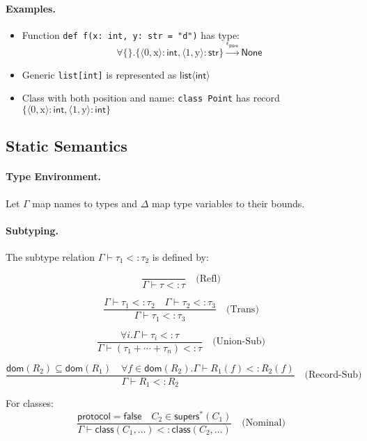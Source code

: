 \paragraph{Examples.}
\begin{itemize}
\item Function \texttt{def f(x: int, y: str = "d")} has type:
 \[\forall \{\}.\{\langle 0, \text{x} \rangle : \mathsf{int}, \langle 1, \text{y} \rangle : \mathsf{str}\} \xrightarrow{\epsilon_\mathsf{pure}} \mathsf{None}\]
\item Generic \texttt{list[int]} is represented as $\mathsf{list}\langle\mathsf{int}\rangle$
\item Class with both position and name: \texttt{class Point} has record $\{\langle 0, \text{x} \rangle : \mathsf{int}, \langle 1, \text{y} \rangle : \mathsf{int}\}$
\end{itemize}

\subsection{Static Semantics}

\paragraph{Type Environment.} Let $\Gamma$ map names to types and $\Delta$ map type variables to their bounds.

\paragraph{Subtyping.} The subtype relation $\Gamma \vdash \tau_1 <: \tau_2$ is defined by:

\[
\frac{}{\Gamma \vdash \tau <: \tau} \quad \text{(Refl)}
\]

\[
\frac{\Gamma \vdash \tau_1 <: \tau_2 \quad \Gamma \vdash \tau_2 <: \tau_3}{\Gamma \vdash \tau_1 <: \tau_3} \quad \text{(Trans)}
\]

\[
\frac{\forall i. \Gamma \vdash \tau_i <: \tau}{\Gamma \vdash (\tau_1 + \cdots + \tau_n) <: \tau} \quad \text{(Union-Sub)}
\]

\[
\frac{\mathsf{dom}(R_2) \subseteq \mathsf{dom}(R_1) \quad \forall f \in \mathsf{dom}(R_2). \Gamma \vdash R_1(f) <: R_2(f)}{\Gamma \vdash R_1 <: R_2} \quad \text{(Record-Sub)}
\]

For classes:
\[
\frac{\mathsf{protocol} = \mathsf{false} \quad C_2 \in \mathsf{supers}^*(C_1)}{\Gamma \vdash \mathsf{class}(C_1, \ldots) <: \mathsf{class}(C_2, \ldots)} \quad \text{(Nominal)}
\]

